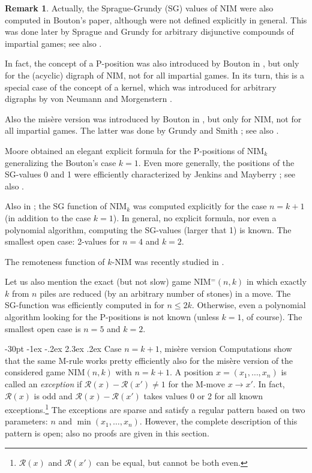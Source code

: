 \documentclass[10pt]{article}
\makeatletter
\renewcommand\section{\@startsection {section}{1}{\z@}
{-30pt \@plus -1ex \@minus -.2ex}
{2.3ex \@plus.2ex}
{\normalfont\normalsize\bfseries\boldmath}}
\theoremstyle{definition}
\newtheorem{remark}{Remark}
\def\R{\mathcal{R}}
\makeatother
\begin{document}
\begin{remark} 
Actually, the Sprague-Grundy (SG) values
of NIM were also computed in Bouton's paper, 
although were not defined explicitly in general. This 
was done later by Sprague \cite{Spr36} 
and Grundy \cite{Gru39} for 
arbitrary disjunctive compounds 
of impartial games; see also \cite{Smi66,Con76}. 

In fact, the concept of a P-position 
was also introduced by Bouton in \cite{Bou901}, 
but only for the (acyclic) digraph of NIM, 
not for all impartial games. 
In its turn, this is a special case 
of the concept of a kernel, 
which was introduced for arbitrary digraphs 
by von Neumann and Morgenstern \cite{NM44}. 

Also the mis\`ere version 
was introduced by Bouton in \cite{Bou901},  
but only for NIM, not for all impartial games. 
The latter was done by Grundy and Smith 
\cite{GS56}; see also \cite{Con76,Smi66,Gur07,Gur07a,GH18}.
\end{remark} 

Moore \cite{Moo910} obtained an elegant explicit formula 
for the P-positions of NIM$_k$ 
generalizing the Bouton's case  $k=1$. 
Even more generally, the positions 
of the SG-values 0 and 1  were efficiently characterized by 
Jenkins and Mayberry \cite{JM80}; see also 
\cite[Section 4]{BGHMM17}.  

Also in \cite{JM80};
the SG function of NIM$_k$  
was computed explicitly for the case  $n = k+1$ 
(in addition to the case $k=1$).
In general, no explicit formula, 
nor even a polynomial algorithm, 
computing the SG-values 
(larger that 1)  is known. 
The smallest open case: 
2-values for  $n=4$ and $k=2$. 

\medskip 

The remoteness function of  $k$-NIM was recently studied 
in \cite{BGMV23}. 

\medskip 

Let us also mention 
the exact (but not slow) game NIM$^=(n,k)$  \cite{BGHM15,BGHMM17} 
in which exactly $k$ from $n$ piles are reduced 
(by an arbitrary number of stones) in a move. 
The SG-function was efficiently computed 
in \cite{BGHM15,BGHMM17} for $n \leq 2k$. 
Otherwise, even a polynomial algorithm 
looking for the P-positions is not known
(unless $k=1$, of course). 
The smallest open case is  $n=5$  and  $k=2$.

\section{Case $n = k+1$, mis\`ere version}
\label{s1}
Computations show that the same M-rule 
works pretty efficiently also for the mis\`ere version 
of the considered game NIM$(n,k)$  with $n = k+1$. 
A position $x = (x_1, \dots, x_n)$  is called 
an {\em exception} if 
$\R(x) - \R(x') \neq 1$  for the M-move $x \to x'$.
In fact, $\R(x)$ is odd and $\R(x) - \R(x')$ takes values 0 or 2 
for all known exceptions.\footnote{$\R(x)$ and  $\R(x')$ 
can be equal, but cannot be both even.}
The exceptions are sparse and 
satisfy a regular pattern based on 
two parameters: $n$  and  $\min(x_1, \dots, x_n)$.  
However, the complete description of this pattern 
is open; also no proofs are given in this section. 
\end{document}
